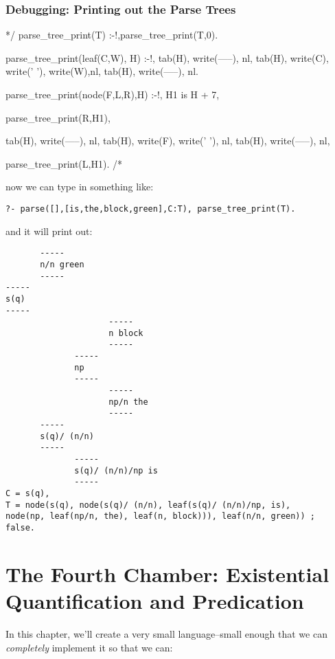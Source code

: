 \documentclass{book}[9pt]
\newenvironment{code}%
{\small \verbatim}%
{\endverbatim \large}
\begin{document}
\subsection{Debugging: Printing out the Parse Trees}

\begin{code}
*/
parse_tree_print(T) :-!,parse_tree_print(T,0).

parse_tree_print(leaf(C,W), H) :-!,
        tab(H), write(-----),    nl,
        tab(H), write(C), write(' '), write(W),nl,
        tab(H), write(-----),    nl.
        
parse_tree_print(node(F,L,R),H) :-!,
        H1 is H + 7,
        
        parse_tree_print(R,H1),
        
        tab(H), write(-----),    nl,
        tab(H), write(F), write(' '), nl,
        tab(H), write(-----),    nl,
        
        parse_tree_print(L,H1).
/*
\end{code}

\noindent now we can type in something like:
\begin{verbatim}
?- parse([],[is,the,block,green],C:T), parse_tree_print(T).
\end{verbatim}
\noindent and it will print out:
\begin{verbatim}
       -----
       n/n green
       -----
-----
s(q) 
-----
                     -----
                     n block
                     -----
              -----
              np 
              -----
                     -----
                     np/n the
                     -----
       -----
       s(q)/ (n/n) 
       -----
              -----
              s(q)/ (n/n)/np is
              -----
C = s(q),
T = node(s(q), node(s(q)/ (n/n), leaf(s(q)/ (n/n)/np, is), 
node(np, leaf(np/n, the), leaf(n, block))), leaf(n/n, green)) ;
false.
\end{verbatim}

\chapter{The Fourth Chamber: Existential Quantification and Predication}
\label{language_game_0}

In this chapter, we'll create a very small language--small enough that
we can {\em completely} implement it so that we can:
\end{document}
